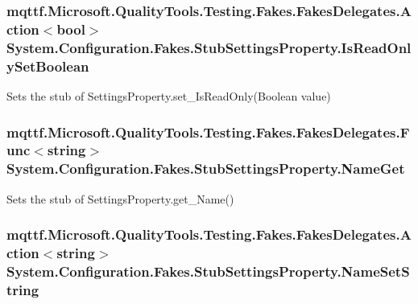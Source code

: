 \hypertarget{class_system_1_1_configuration_1_1_fakes_1_1_stub_settings_property_ab9f919a60d03abd6b1ea8b5724887d21}{
\subsubsection[{Is\-Read\-Only\-Set\-Boolean}]{\setlength{\rightskip}{0pt plus 5cm}mqttf.\-Microsoft.\-Quality\-Tools.\-Testing.\-Fakes.\-Fakes\-Delegates.\-Action$<$bool$>$ System.\-Configuration.\-Fakes.\-Stub\-Settings\-Property.\-Is\-Read\-Only\-Set\-Boolean}}\label{class_system_1_1_configuration_1_1_fakes_1_1_stub_settings_property_ab9f919a60d03abd6b1ea8b5724887d21}


Sets the stub of Settings\-Property.\-set\-\_\-\-Is\-Read\-Only(\-Boolean value)

\hypertarget{class_system_1_1_configuration_1_1_fakes_1_1_stub_settings_property_a1bc4e2854a021c4257cc4ba3bc6a564a}{
\subsubsection[{Name\-Get}]{\setlength{\rightskip}{0pt plus 5cm}mqttf.\-Microsoft.\-Quality\-Tools.\-Testing.\-Fakes.\-Fakes\-Delegates.\-Func$<$string$>$ System.\-Configuration.\-Fakes.\-Stub\-Settings\-Property.\-Name\-Get}}\label{class_system_1_1_configuration_1_1_fakes_1_1_stub_settings_property_a1bc4e2854a021c4257cc4ba3bc6a564a}


Sets the stub of Settings\-Property.\-get\-\_\-\-Name()

\hypertarget{class_system_1_1_configuration_1_1_fakes_1_1_stub_settings_property_aa6dd28afc64825c166f1ec2bbfed7107}{
\subsubsection[{Name\-Set\-String}]{\setlength{\rightskip}{0pt plus 5cm}mqttf.\-Microsoft.\-Quality\-Tools.\-Testing.\-Fakes.\-Fakes\-Delegates.\-Action$<$string$>$ System.\-Configuration.\-Fakes.\-Stub\-Settings\-Property.\-Name\-Set\-String}}\label{class_system_1_1_configuration_1_1_fakes_1_1_stub_settings_property_aa6dd28afc64825c166f1ec2bbfed7107}



